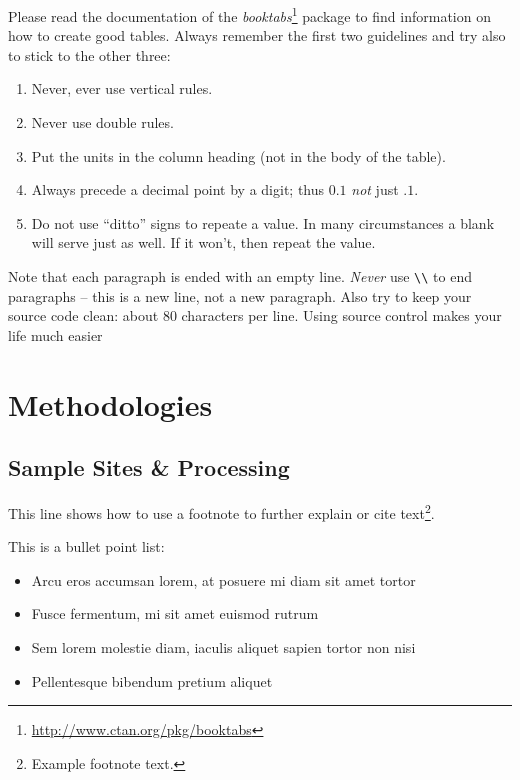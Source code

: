 \documentclass[
a4paper, %
10pt, %
unnumberedsections, %
twoside, %
]{LTJournalArticle}
\begin{document}
	Please read the documentation of the
	\emph{booktabs}\footnote{\url{http://www.ctan.org/pkg/booktabs}} 
	package to find information on how to create good tables.
	Always remember the first two guidelines and try also to stick to the other three:
	\begin{enumerate}
		\item Never, ever use vertical rules.
		\item Never use double rules.
		\item Put the units in the column heading (not in the body of the table).
		\item Always precede a decimal point by a digit; thus $0.1$ \emph{not} just $.1$.
		\item Do not use \enquote{ditto} signs to repeate a value. In many circumstances a blank will serve just as well. If it won't, then repeat the value.
	\end{enumerate}
	
	Note that each paragraph is ended with an empty line. 
	\emph{Never} use \verb|\\| to end paragraphs -- this is a new line, not a new paragraph.
	Also try to keep your source code clean: about 80 characters per line.
	Using source control makes your life much easier
	
	
	\section{Methodologies}
	
	\subsection{Sample Sites \& Processing}
	
	This line shows how to use a footnote to further explain or cite text\footnote{Example footnote text.}.
	
	This is a bullet point list:
	
	\begin{itemize}
		\item Arcu eros accumsan lorem, at posuere mi diam sit amet tortor
		\item Fusce fermentum, mi sit amet euismod rutrum
		\item Sem lorem molestie diam, iaculis aliquet sapien tortor non nisi
		\item Pellentesque bibendum pretium aliquet
	\end{itemize}
	
\end{document}

